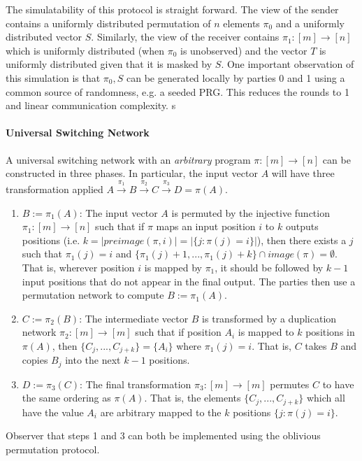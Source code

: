 The simulatability of this protocol is straight forward. The view of the sender contains a uniformly distributed permutation of $n$ elements $\pi_0$ and a uniformly distributed vector $S$. Similarly, the view of the receiver contains $\pi_1: [m]\rightarrow [n]$ which is uniformly distributed (when $\pi_0$ is unobserved) and the vector $T$ is uniformly distributed given that it is masked by $S$. One important observation of this simulation is that $\pi_0,S$ can be generated locally by parties 0 and 1 using a common source of randomness, e.g. a seeded PRG. This reduces the rounds to 1 and linear communication complexity. 
s
\paragraph{Universal Switching Network}

A universal switching network with an \emph{arbitrary} program $\pi : [m]\rightarrow [n]$ can be constructed in three phases\cite{MS13, CMRS18}. In particular, the input vector $A$ will have three transformation applied $A\overset{\pi_1}{\rightarrow}B\overset{\pi_2}{\rightarrow}C\overset{\pi_3}{\rightarrow}D=\pi(A)$.
\begin{enumerate}
	\item $B:=\pi_1(A)$:  The input vector $A$ is permuted by the injective function $\pi_1:[m]\rightarrow[n]$ such that if $\pi$ maps an input position $i$ to $k$ outputs positions (i.e. $k=|preimage(\pi,i)|=|\{ j : \pi(j)=i \}|$), then there exists a $j$ such that $\pi_1(j)=i$  and $\{\pi_1(j)+ 1,...,\pi_1(j )+k \} \cap image(\pi) = \emptyset$. That is, wherever position $i$ is mapped by $\pi_1$, it should be followed by $k-1$ input positions that do not appear in the final output. The parties then use a permutation network to compute $B:=\pi_1(A)$.
	
	\item $C:=\pi_2(B)$: The intermediate vector $B$ is transformed by a duplication network $\pi_2:[m]\rightarrow[m]$ such that if position $A_i$ is mapped to $k$ positions in $\pi(A)$, then $\{ C_{j},...,C_{j+k}\} = \{A_i\}$ where $\pi_1(j)=i$. That is, $C$ takes $B$ and copies $B_{j}$ into the next $k-1$ positions. 
	
	\item $D:=\pi_3(C)$: The final transformation $\pi_3:[m]\rightarrow[m]$  permutes $C$ to have the same ordering as $\pi(A)$. That is, the elements $\{ C_{j},...,C_{j+k}\}$ which all have the value  $A_i$ are arbitrary mapped to the $k$ positions $\{ j : \pi(j)=i \}$.
\end{enumerate}
Observer that steps 1 and 3 can both be implemented using the oblivious permutation protocol.%

